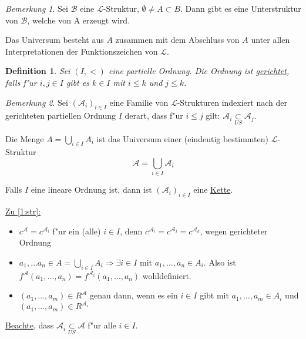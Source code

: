 \documentclass[a4paper,12pt,numbers=noenddot,parskip=full]{scrartcl}
\newcommand{\scrL}{\mathcal{L}}
\newcommand{\scrA}{\mathcal{A}}
\newcommand{\scrB}{\mathcal{B}}
\theoremstyle{dotless}
\newtheorem{definition}[theorem]{Definition}
\theoremstyle{remark}
\newtheorem*{remark}{Bemerkung}
\begin{document}
\begin{remark}
	Sei $\scrB$ eine $\scrL$-Struktur, $\emptyset \ne A \subset B$. Dann gibt es eine Unterstruktur von $\scrB$, welche von A erzeugt wird.
	
	Das Universum besteht aus $A$ zusammen mit dem Abschluss von $A$ unter allen Interpretationen der Funktionszeichen von $\scrL$.
\end{remark}

\begin{definition}
	Sei $(I, <)$ eine partielle Ordnung. Die Ordnung ist \underline{gerichtet}, falls f"ur $i, j \in I$ gibt es $k \in I$ mit $i \leq k$ und $j \leq k$.
\end{definition}

\begin{remark}
	Sei $(\scrA_i)_{i \in I}$ eine Familie von $\scrL$-Strukturen indexiert nach der gerichteten partiellen Ordnung $I$ derart, dass f"ur $i \leq j$ gilt: $\scrA_i \underset{US}{\subset} \scrA_j$.
	
	Die Menge $A=\underset{i \in I}{\bigcup} A_i$ ist das Universum einer (eindeutig bestimmten) $\scrL$-Struktur
	\begin{equation}
		\scrA = \underset{i \in I}{\bigcup} \scrA_i \label{1:str}
	\end{equation}
	
	Falls $I$ eine lineare Ordnung ist, dann ist $(\scrA_i)_{i \in I}$ eine \underline{Kette}.
	
	\underline{Zu \ref{1:str}:} \begin{itemize}
		\item $c^\scrA=c^{\scrA_i}$ f"ur ein (alle) $i \in I$, denn $c^{\scrA_i}=c^{\scrA_j}=c^{\scrA_k}$, {wegen gerichteter Ordnung}
		\item $a_1, \dots a_n \in A = \underset{i \in I}{\bigcup} A_i \Longrightarrow \exists i \in I$ mit $a_1, \dots, a_n \in A_i$.
		Also ist $f^\scrA (a_1, \dots, a_n) = f^{\scrA_i} (a_1, \dots, a_n)$ wohldefiniert.
		\item $(a_1, \dots, a_m) \in R^\scrA$ genau dann, wenn es ein $i \in I$ gibt mit $a_1, \dots, a_m \in A_i$ und $(a_1, \dots, a_m) \in R^{\scrA_i}$
	\end{itemize}

	\underline{Beachte}, dass $\scrA_i \underset{US}{\subset} \scrA$ f"ur alle $i \in I$.
\end{remark}
\end{document}

